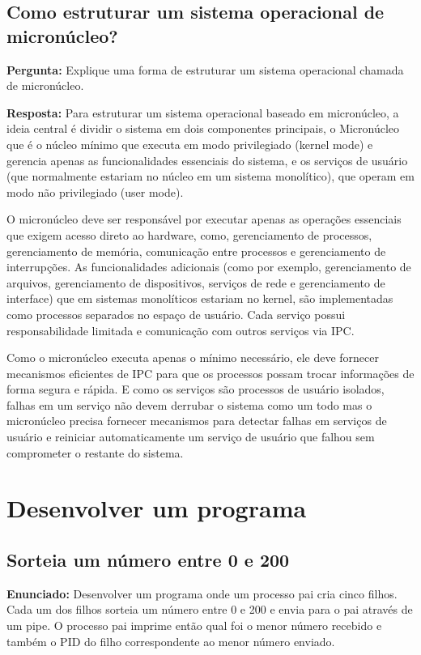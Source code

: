 \documentclass{article}
\begin{document}
\subsection{Como estruturar um sistema operacional de micronúcleo?}
\textbf{Pergunta:} Explique uma forma de estruturar um sistema operacional chamada de micronúcleo.\newline

\textbf{Resposta:} Para estruturar um sistema operacional baseado em micronúcleo, a ideia central é dividir o sistema em dois componentes principais, o Micronúcleo que é o núcleo mínimo que executa em modo privilegiado (kernel mode) e gerencia apenas as funcionalidades essenciais do sistema, e os serviços de usuário (que normalmente estariam no núcleo em um sistema monolítico), que operam em modo não privilegiado (user mode).

O micronúcleo deve ser responsável por executar apenas as operações essenciais que exigem acesso direto ao hardware, como, gerenciamento de processos, gerenciamento de memória, comunicação entre processos e gerenciamento de interrupções. As funcionalidades adicionais (como por exemplo, gerenciamento de arquivos, gerenciamento de dispositivos, serviços de rede e  gerenciamento de interface) que em sistemas monolíticos estariam no kernel, são implementadas como processos separados no espaço de usuário. Cada serviço possui responsabilidade limitada e comunicação com outros serviços via IPC. 

Como o micronúcleo executa apenas o mínimo necessário, ele deve fornecer mecanismos eficientes de IPC para que os processos possam trocar informações de forma segura e rápida. E como os serviços são processos de usuário isolados, falhas em um serviço não devem derrubar o sistema como um todo mas o micronúcleo precisa fornecer mecanismos para detectar falhas em serviços de usuário e reiniciar automaticamente um serviço de usuário que falhou sem comprometer o restante do sistema. \cite{tanenbaum2021} \cite{ufpr_sistemas_operacionais} \cite{univasf_microkernel}

\section{Desenvolver um programa}

\subsection{Sorteia um número entre 0 e 200}
\textbf{Enunciado:} Desenvolver um programa onde um processo pai cria cinco filhos. Cada um dos filhos sorteia um número entre 0 e 200 e envia para o pai através de um pipe. O processo pai imprime então qual foi o menor número recebido e também o PID do filho correspondente ao menor número enviado.\newline
\end{document}
